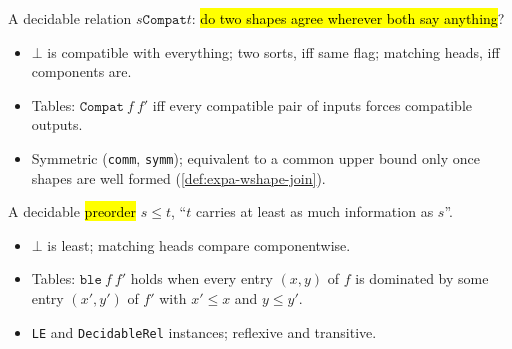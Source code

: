 \begin{definition}
\label{def:expa-shape-compat}
\leanok
{}
 A decidable relation $s\mathbin{\mathtt{Compat}}t$: \hl{do two shapes agree wherever
both say anything}?
\begin{itemize}
\item $\bot$ is compatible with everything; two sorts, iff same flag; matching heads, iff components
are.
\item Tables: $\mathtt{Compat}\ f\ f'$ iff every compatible pair of inputs forces compatible outputs.
\item Symmetric (\texttt{comm}, \texttt{symm}); equivalent to a common upper bound only once shapes
are well formed (\ref{def:expa-wshape-join}).
\end{itemize}
\end{definition}

\begin{definition}
\label{def:expa-shape-le}
\leanok
{}
 A decidable \hl{preorder} $s\le t$, ``$t$ carries at least as much information as
$s$''.
\begin{itemize}
\item $\bot$ is least; matching heads compare componentwise.
\item Tables: $\mathtt{ble}\ f\ f'$ holds when every entry $(x,y)$ of $f$ is dominated by some entry
$(x',y')$ of $f'$ with $x'\le x$ and $y\le y'$.
\item \texttt{LE} and \texttt{DecidableRel} instances; reflexive and transitive.
\end{itemize}
\end{definition}

